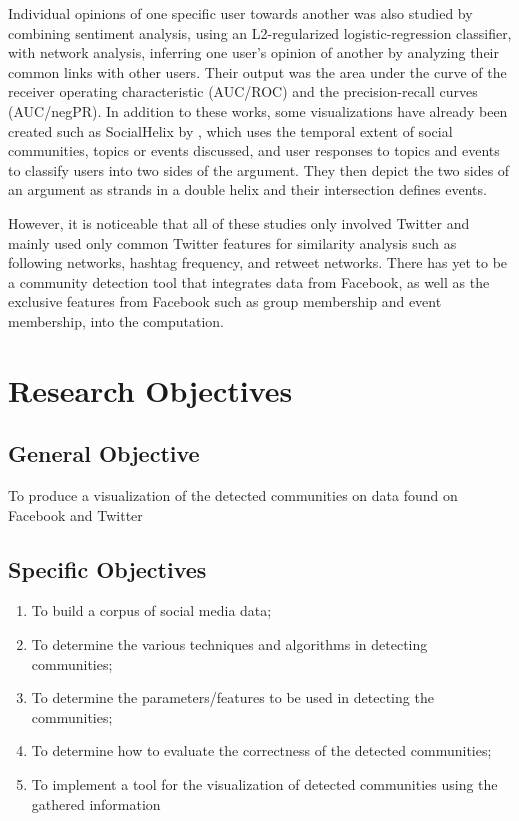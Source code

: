 Individual opinions of one specific user towards another was also studied by  combining sentiment analysis, using an L2-regularized logistic-regression classifier, with network analysis, inferring one user’s opinion of another by analyzing their common links with other users. Their output was the area under the curve of the receiver operating characteristic (AUC/ROC) and the precision-recall curves (AUC/negPR). In addition to these works, some visualizations have already been created such as SocialHelix by , which uses the temporal extent of social communities, topics or events discussed, and user responses to topics and events to classify users into two sides of the argument. They then depict the two sides of an argument as strands in a double helix and their intersection defines events.

However, it is noticeable that all of these studies only involved Twitter and mainly used only common Twitter features for similarity analysis such as following networks, hashtag frequency, and retweet networks. There has yet to be a community detection tool that integrates data from Facebook, as well as the exclusive features from Facebook such as group membership and event membership, into the computation.

\section{Research Objectives}
\label{sec:researchobjectives}

\subsection{General Objective}
\label{sec:generalobjective}

To produce a visualization of the detected communities on data found on Facebook and Twitter

\subsection{Specific Objectives}
\label{sec:specificobjectives}

\begin{enumerate}
	\item To build a corpus of social media data;
	\item To determine the various techniques and algorithms in detecting communities;
	\item To determine the parameters/features to be used in detecting the communities;
	\item To determine how to evaluate the correctness of the detected communities;
	\item To implement a tool for the visualization of detected communities using the gathered information
\end{enumerate}

